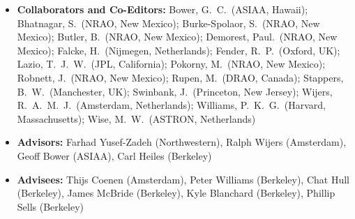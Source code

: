 \documentclass[11pt]{article}
\begin{document}
\begin{itemize}
 \item {\bf Collaborators and Co-Editors:}
Bower, G.~C.~(ASIAA, Hawaii);
Bhatnagar, S.~(NRAO, New Mexico);
Burke-Spolaor, S.~(NRAO, New Mexico);
Butler, B.~(NRAO, New Mexico);
Demorest, Paul.~(NRAO, New Mexico);
Falcke, H.~(Nijmegen, Netherlands);
Fender, R.~P.~(Oxford, UK);
Lazio, T.~J.~W.~(JPL, California);
Pokorny, M.~(NRAO, New Mexico);
Robnett, J.~(NRAO, New Mexico);
Rupen, M.~(DRAO, Canada);
Stappers, B.~W.~(Manchester, UK);
Swinbank, J.~(Princeton, New Jersey);
Wijers, R.~A.~M.~J.~(Amsterdam, Netherlands);
Williams, P.~K.~G.~(Harvard, Massachusetts);
Wise, M.~W.~(ASTRON, Netherlands)

 \item {\bf Advisors:} Farhad Yusef-Zadeh (Northwestern), Ralph Wijers (Amsterdam), Geoff Bower (ASIAA), Carl Heiles (Berkeley)

 \item {\bf Advisees:} Thijs Coenen (Amsterdam), Peter Williams (Berkeley), Chat Hull (Berkeley), James McBride (Berkeley), Kyle Blanchard (Berkeley), Phillip Sells (Berkeley)
\end{itemize}

\thispagestyle{empty}
\end{document}
